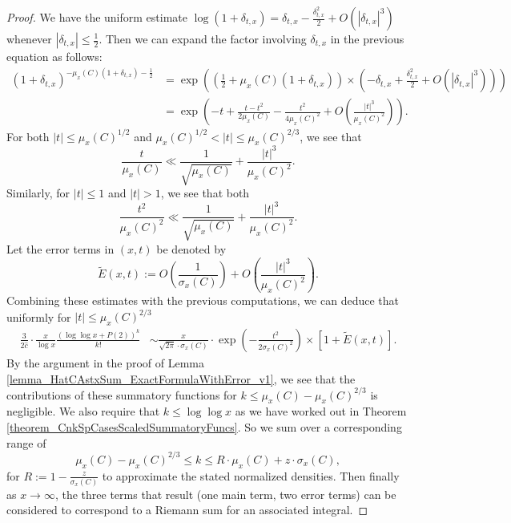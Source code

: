 \documentclass[11pt,reqno,a4letter]{article}
\numberwithin{figure}{section}
\numberwithin{table}{section}
\theoremstyle{plain}
\numberwithin{theorem}{section}
\theoremstyle{definition}
\begin{document}
\begin{proof}
We have the uniform estimate 
$\log(1+\delta_{t,x}) = \delta_{t,x} - \frac{\delta_{t,x}^2}{2} + O(|\delta_{t,x}|^3)$ whenever 
$|\delta_{t,x}| \leq \frac{1}{2}$. Then we can expand the factor involving $\delta_{t,x}$ 
in the previous equation as follows: 
\begin{align*} 
(1+\delta_{t,x})^{-\mu_x(C) (1+\delta_{t,x}) - \frac{1}{2}} & = 
     \exp\left(\left(\frac{1}{2}+\mu_x(C) (1+\delta_{t,x})\right) \times 
     \left(-\delta_{t,x} + \frac{\delta_{t,x}^2}{2} + O(|\delta_{t,x}|^3)\right)\right) \\ 
     & = \exp\left(-t + \frac{t-t^2}{2\mu_x(C)} - \frac{t^2}{4\mu_x(C)^2} + 
     O\left(\frac{|t|^3}{\mu_x(C)^2}\right)\right). 
\end{align*} 
For both $|t| \leq \mu_x(C)^{1/2}$ and 
$\mu_x(C)^{1/2} < |t| \leq \mu_x(C)^{2/3}$, 
we see that 
\[
\frac{t}{\mu_x(C)} \ll \frac{1}{\sqrt{\mu_x(C)}} + \frac{|t|^3}{\mu_x(C)^2}. 
\]
Similarly, for $|t| \leq 1$ and $|t| > 1$, we see that both 
\[
\frac{t^2}{\mu_x(C)^2} \ll \frac{1}{\sqrt{\mu_x(C)}} + 
     \frac{|t|^3}{\mu_x(C)^2}. 
\] 
Let the error terms in $(x, t)$ be denoted by 
\[
\widetilde{E}(x, t) := O\left(\frac{1}{\sigma_x(C)}\right) + 
     O\left(\frac{|t|^3}{\mu_x(C)^2}\right). 
\]
Combining these estimates with the previous computations, we can deduce that 
uniformly for $|t| \leq \mu_x(C)^{2/3}$ 
\begin{align*} 
\frac{3}{2\hat{c}} \cdot \frac{x}{\log x} \frac{(\log\log x + P(2))^{k}}{k!} & \sim 
     \frac{x}{\sqrt{2\pi} \cdot \sigma_x(C)} 
     \cdot \exp\left(-\frac{t^2}{2\sigma_x(C)^2}\right) \times 
     \left[1 + \widetilde{E}(x, t)\right]. 
\end{align*} 
By the argument in the proof of 
Lemma \ref{lemma_HatCAstxSum_ExactFormulaWithError_v1}, we see that 
the contributions of these summatory functions for 
$k \leq \mu_x(C) - \mu_x(C)^{2/3}$ is negligible. 
We also require that $k \leq \log\log x$ as we have worked out in 
Theorem \ref{theorem_CnkSpCasesScaledSummatoryFuncs}. So we sum over a 
corresponding range of 
\[
\mu_x(C) -\mu_x(C)^{2/3} \leq k \leq R \cdot \mu_x(C) + z \cdot \sigma_x(C), 
\] 
for $R := 1 - \frac{z}{\sigma_x(C)}$ to approximate the 
stated normalized densities. 
Then finally as $x \rightarrow \infty$, the 
three terms that result (one main term, two error terms) 
can be considered to correspond to a Riemann sum for an associated integral. 
\end{proof} 
\end{document}
